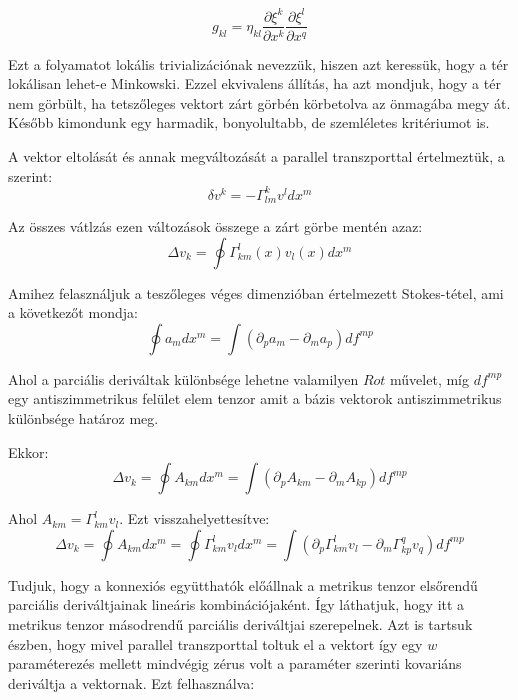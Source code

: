 \documentclass[a4paper,12pt]{article}
\begin{document}
\begin{equation*}
    g_{kl} = \eta_{kl}\frac{\partial \xi^{k}}{\partial x^{k}}\frac{\partial \xi^{l}}{\partial x^{q}}
\end{equation*}
\par Ezt a folyamatot lokális trivializációnak nevezzük, hiszen azt keressük, hogy a tér lokálisan lehet-e Minkowski. Ezzel ekvivalens állítás, ha azt mondjuk, hogy a tér nem görbült, ha tetszőleges vektort zárt görbén körbetolva az önmagába megy át. Később kimondunk egy harmadik, bonyolultabb, de szemléletes kritériumot is.
\par A vektor eltolását és annak megváltozását a parallel transzporttal értelmeztük, a szerint:
\begin{equation*}
    \delta v^{k} = -\Gamma_{lm}^{k}v^{l}dx^{m} 
\end{equation*}
\par Az összes vátlzás ezen változások összege a zárt görbe mentén azaz:
\begin{equation*}
    \Delta v_{k} = \oint \Gamma_{km}^{l}(x)v_{l}(x)dx^{m}
\end{equation*}
\par Amihez felasználjuk a teszőleges véges dimenzióban értelmezett Stokes-tétel, ami a következőt mondja:
\begin{equation*}
    \oint a_{m}dx^{m} = \int (\partial_{p}a_{m} - \partial_{m}a_{p})df^{mp}
\end{equation*}
\par Ahol a parciális deriváltak különbsége lehetne valamilyen $Rot$ művelet, míg $df^{mp}$ egy antiszimmetrikus felület elem tenzor amit a bázis vektorok antiszimmetrikus különbsége határoz meg.
\par Ekkor:
\begin{equation*}
    \Delta v_{k} = \oint A_{km}dx^{m} = \int (\partial_{p}A_{km} - \partial_{m}A_{kp})df^{mp}
\end{equation*}
\par Ahol $A_{km} = \Gamma_{km}^{l}v_{l}$. Ezt visszahelyettesítve:
\begin{equation*}
    \Delta v_{k} = \oint A_{km}dx^{m} = \oint \Gamma_{km}^{l}v_{l}dx^{m} = \int (\partial_{p} \Gamma_{km}^{l}v_{l} - \partial_{m}\Gamma_{kp}^{q}v_{q})df^{mp}
\end{equation*}
\par Tudjuk, hogy a konnexiós együtthatók előállnak a metrikus tenzor elsőrendű parciális deriváltjainak lineáris kombinációjaként. Így láthatjuk, hogy itt a metrikus tenzor másodrendű parciális deriváltjai szerepelnek. Azt is tartsuk észben, hogy mivel parallel transzporttal toltuk el a vektort így egy $w$ paraméterezés mellett mindvégig zérus volt a paraméter szerinti kovariáns deriváltja a vektornak. Ezt felhasználva:
\end{document}
